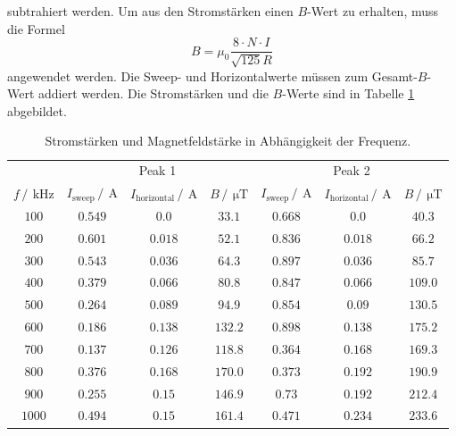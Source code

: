 subtrahiert werden. Um aus den Stromstärken einen $B$-Wert zu erhalten, muss die Formel 
\begin{equation*}
  B=\mu_0\frac{8\cdot N \cdot I}{\sqrt{125}R}
\end{equation*}
angewendet werden. Die Sweep- und Horizontalwerte müssen zum Gesamt-$B$-Wert addiert werden. Die Stromstärken und die 
$B$-Werte sind in Tabelle \ref{tab:Messdaten} abgebildet.
\begin{table}
  \centering
  \caption{Stromstärken und Magnetfeldstärke in Abhängigkeit der Frequenz.}
  \label{tab:Messdaten}
  \begin{tabular}{c c c c c c c}
    \toprule
    &\multicolumn{3}{c}{Peak 1}&\multicolumn{3}{c}{Peak 2}\\
    \cmidrule(lr){2-4}\cmidrule(lr){5-7}
    $f\,/\,\SI{}{\kilo\hertz}$&$I_{\text{sweep}}\,/\,\SI{}{\ampere}$&$I_{\text{horizontal}}\,/\,\SI{}{\ampere}$&$B\,/\,\SI{}{\micro\tesla}$&$I_{\text{sweep}}\,/\,\SI{}{\ampere}$&$I_{\text{horizontal}}\,/\,\SI{}{\ampere}$&$B\,/\,\SI{}{\micro\tesla}$\\
    \midrule
    $\num{100}$ &$\num{0.549}$&$\num{0.0}$  &$\num{33.1}$&$\num{0.668}$&$\num{0.0}$&$\num{40.3}$\\
    $\num{200}$ &$\num{0.601}$&$\num{0.018}$&$\num{52.1}$&$\num{0.836}$&$\num{0.018}$&$\num{66.2}$\\
    $\num{300}$ &$\num{0.543}$&$\num{0.036}$&$\num{64.3}$&$\num{0.897}$&$\num{0.036}$&$\num{85.7}$\\
    $\num{400}$ &$\num{0.379}$&$\num{0.066}$&$\num{80.8}$&$\num{0.847}$&$\num{0.066}$&$\num{109.0}$\\
    $\num{500}$ &$\num{0.264}$&$\num{0.089}$&$\num{94.9}$&$\num{0.854}$&$\num{0.09}$&$\num{130.5}$\\
    $\num{600}$ &$\num{0.186}$&$\num{0.138}$&$\num{132.2}$&$\num{0.898}$&$\num{0.138}$&$\num{175.2}$\\
    $\num{700}$ &$\num{0.137}$&$\num{0.126}$&$\num{118.8}$&$\num{0.364}$&$\num{0.168}$&$\num{169.3}$\\
    $\num{800}$ &$\num{0.376}$&$\num{0.168}$&$\num{170.0}$&$\num{0.373}$&$\num{0.192}$&$\num{190.9}$\\
    $\num{900}$ &$\num{0.255}$&$\num{0.15}$ &$\num{146.9}$&$\num{0.73}$&$\num{0.192}$&$\num{212.4}$\\
    $\num{1000}$&$\num{0.494}$&$\num{0.15}$ &$\num{161.4}$&$\num{0.471}$&$\num{0.234}$&$\num{233.6}$\\
    \bottomrule
  \end{tabular}
\end{table}
